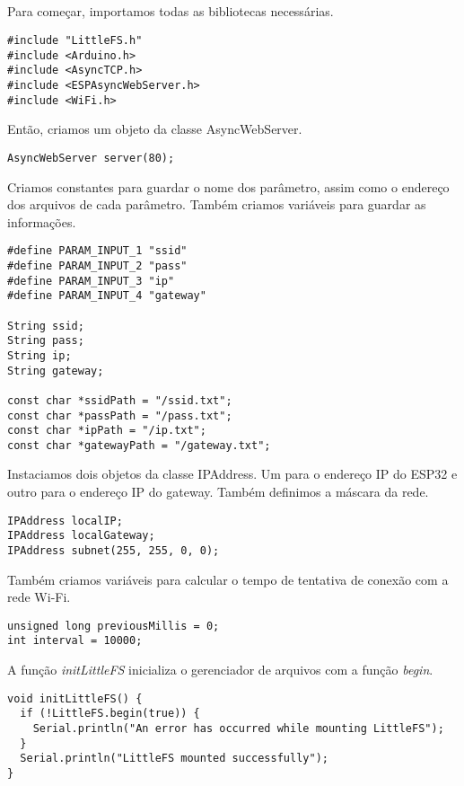 \subsection{}

Para começar, importamos todas as bibliotecas necessárias.

\begin{lstlisting}
#include "LittleFS.h"
#include <Arduino.h>
#include <AsyncTCP.h>
#include <ESPAsyncWebServer.h>
#include <WiFi.h>
\end{lstlisting}

Então, criamos um objeto da classe AsyncWebServer.

\begin{lstlisting}
AsyncWebServer server(80);
\end{lstlisting}

Criamos constantes para guardar o nome dos parâmetro, assim como o endereço dos arquivos de cada parâmetro. Também criamos variáveis para guardar as informações.

\begin{lstlisting}
#define PARAM_INPUT_1 "ssid"
#define PARAM_INPUT_2 "pass"
#define PARAM_INPUT_3 "ip"
#define PARAM_INPUT_4 "gateway"

String ssid;
String pass;
String ip;
String gateway;

const char *ssidPath = "/ssid.txt";
const char *passPath = "/pass.txt";
const char *ipPath = "/ip.txt";
const char *gatewayPath = "/gateway.txt";
\end{lstlisting}

Instaciamos dois objetos da classe IPAddress. Um para o endereço IP do ESP32 e outro para o endereço IP do gateway. Também definimos a máscara da rede.

\begin{lstlisting}
IPAddress localIP;
IPAddress localGateway;
IPAddress subnet(255, 255, 0, 0);
\end{lstlisting}

Também criamos variáveis para calcular o tempo de tentativa de conexão com a rede Wi-Fi.

\begin{lstlisting}
unsigned long previousMillis = 0;
int interval = 10000;
\end{lstlisting}

A função \textit{initLittleFS} inicializa o gerenciador de arquivos com a função \textit{begin}.

\begin{lstlisting}
void initLittleFS() {
  if (!LittleFS.begin(true)) {
    Serial.println("An error has occurred while mounting LittleFS");
  }
  Serial.println("LittleFS mounted successfully");
}
\end{lstlisting}


